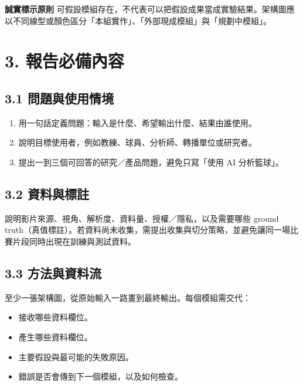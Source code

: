 \documentclass[11pt]{article}
\begin{document}
\begin{tcolorbox}[colback=Accent,colframe=Rule,arc=1mm,boxrule=0.45pt]
\textbf{誠實標示原則}\quad
可假設模組存在，不代表可以把假設成果當成實驗結果。架構圖應以不同線型或顏色區分「本組實作」、「外部現成模組」與「規劃中模組」。
\end{tcolorbox}

\section{3. 報告必備內容}

\subsection{3.1 問題與使用情境}

\begin{enumerate}[leftmargin=1.8em,label=\arabic*.,itemsep=3pt]
  \item 用一句話定義問題：輸入是什麼、希望輸出什麼、結果由誰使用。
  \item 說明目標使用者，例如教練、球員、分析師、轉播單位或研究者。
  \item 提出一到三個可回答的研究／產品問題，避免只寫「使用 AI 分析籃球」。
\end{enumerate}

\subsection{3.2 資料與標註}

說明影片來源、視角、解析度、資料量、授權／隱私，以及需要哪些 ground truth（真值標註）。若資料尚未收集，需提出收集與切分策略，並避免讓同一場比賽片段同時出現在訓練與測試資料。

\subsection{3.3 方法與資料流}

至少一張架構圖，從原始輸入一路畫到最終輸出。每個模組需交代：

\begin{itemize}[leftmargin=1.6em,itemsep=3pt]
  \item 接收哪些資料欄位。
  \item 產生哪些資料欄位。
  \item 主要假設與最可能的失敗原因。
  \item 錯誤是否會傳到下一個模組，以及如何檢查。
\end{itemize}
\end{document}
